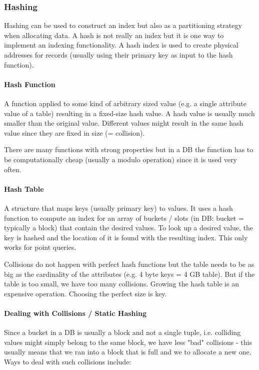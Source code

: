 \subsubsection{Hashing}

Hashing can be used to construct an index but also as a partitioning strategy when allocating data. A hash is not really an index but it is one way to implement an indexing functionality. A hash index is used to create physical addresses for records (usually using their primary key as input to the hash function).

\paragraph{Hash Function}
A function applied to some kind of arbitrary sized value (e.g. a single attribute value of a table) resulting in a fixed-size hash value. A hash value is usually much smaller than the original value. Different values might result in the same hash value since they are fixed in size (= collision).

There are many functions with strong properties but in a DB the function has to be computationally cheap (usually a modulo operation) since it is used very often.

\paragraph{Hash Table}
A structure that maps keys (usually primary key) to values. It uses a hash function to compute an index for an array of buckets / slots (in DB: bucket = typically a block) that contain the desired values. To look up a desired value, the key is hashed and the location of it is found with the resulting index. This only works for point queries.

Collisions do not happen with perfect hash functions but the table needs to be as big as the cardinality of the attributes (e.g. 4 byte keys = 4 GB table). But if the table is too small, we have too many collisions. Growing the hash table is an expensive operation. Choosing the perfect size is key.

\paragraph{Dealing with Collisions / Static Hashing}
Since a bucket in a DB is usually a block and not a single tuple, i.e. colliding values might simply belong to the same block, we have less "bad" collisions - this usually means that we ran into a block that is full and we to allocate a new one. Ways to deal with such collisions include:

